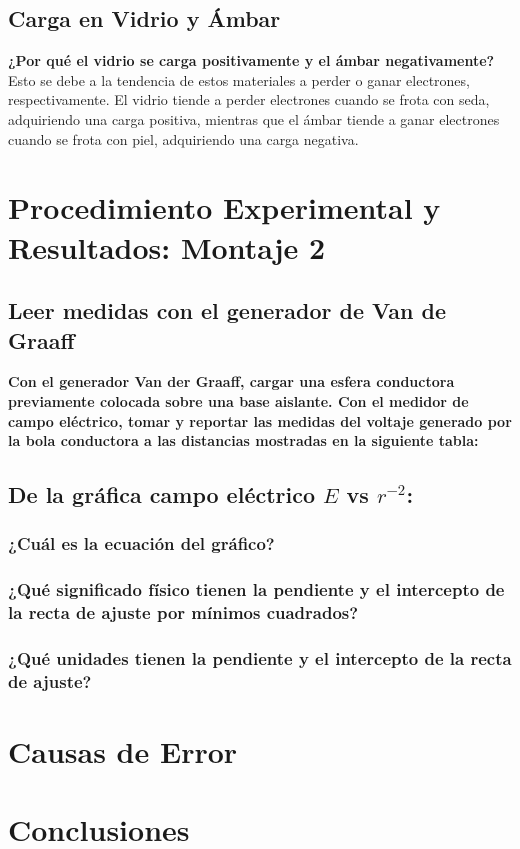 \subsection{Carga en Vidrio y Ámbar}
\textbf{¿Por qué el vidrio se carga positivamente y el ámbar negativamente?} Esto se debe a la tendencia de estos materiales a perder o ganar electrones, respectivamente. El vidrio tiende a perder electrones cuando se frota con seda, adquiriendo una carga positiva, mientras que el ámbar tiende a ganar electrones cuando se frota con piel, adquiriendo una carga negativa.

\section{Procedimiento Experimental y Resultados: Montaje 2}

\subsection{Leer medidas con el generador de Van de Graaff}
\textbf{Con el generador Van der Graaff, cargar una esfera conductora previamente colocada
sobre una base aislante. Con el medidor de campo eléctrico, tomar y reportar las medidas
del voltaje generado por la bola conductora a las distancias mostradas en la siguiente
tabla:}

\subsection{De la gráfica campo eléctrico $E$ vs $r^{-2}$:}
\subsubsection{¿Cuál es la ecuación del gráfico?}
\subsubsection{¿Qué significado físico tienen la pendiente y el intercepto de la recta de ajuste
por mínimos cuadrados?}
\subsubsection{¿Qué unidades tienen la pendiente y el intercepto de la recta de ajuste?}

\section{Causas de Error}
\section{Conclusiones}